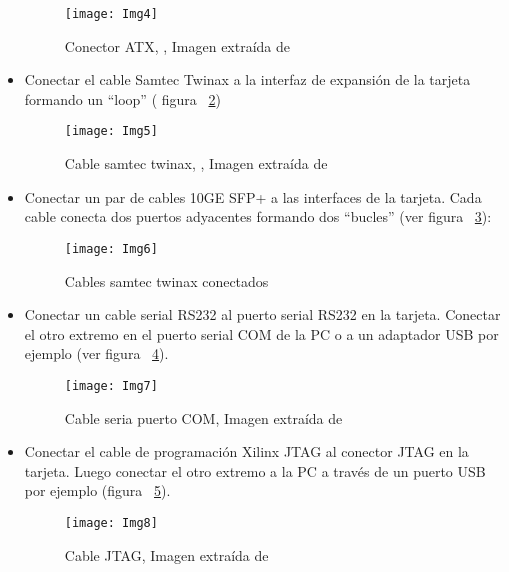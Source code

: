\begin{itemize}
\begin{figure}[htbp!] 
\centering    
\texttt{[image: Img4]}
\caption[Conector ATX]{Conector ATX, , Imagen extra\'ida de \citep{NetFPGA6}}
\label{fig:Img4}
\end{figure}

\item Conectar el cable Samtec Twinax a la interfaz de expansión de la tarjeta formando un “loop” ( figura ~\ref{fig:Img5})

\newpage
\begin{figure}[htbp!] 
\centering    
\texttt{[image: Img5]}
\caption[Cable samtec twinax]{Cable samtec twinax, , Imagen extra\'ida de \citep{NetFPGA6}}
\label{fig:Img5}
\end{figure}

\item Conectar un par de cables 10GE SFP+ a las interfaces de la tarjeta. Cada cable conecta dos puertos adyacentes formando dos “bucles” (ver figura ~\ref{fig:Img6}):

\begin{figure}[htbp!] 
\centering    
\texttt{[image: Img6]}
\caption[Cables samtec twinax conectados]{Cables samtec twinax conectados}
\label{fig:Img6}
\end{figure}

\item Conectar un cable serial RS232 al puerto serial RS232 en la tarjeta. Conectar el otro extremo en el puerto serial COM de la PC o a un adaptador USB por ejemplo (ver figura ~\ref{fig:Img7}).

\begin{figure}[htbp!] 
\centering    
\texttt{[image: Img7]}
\caption[Cable serial puerto COM]{Cable seria puerto COM, Imagen extra\'ida de \citep{NetFPGA6}}
\label{fig:Img7}
\end{figure}

\item Conectar el cable de programación Xilinx JTAG al conector JTAG en la tarjeta. Luego conectar el otro extremo a la PC a través de un puerto USB por ejemplo (figura ~\ref{fig:Img8}).

\newpage
\begin{figure}[htbp!] 
\centering    
\texttt{[image: Img8]}
\caption[Cable JTAG]{Cable JTAG, Imagen extra\'ida de \citep{NetFPGA6}}
\label{fig:Img8}
\end{figure}

\end{itemize}

